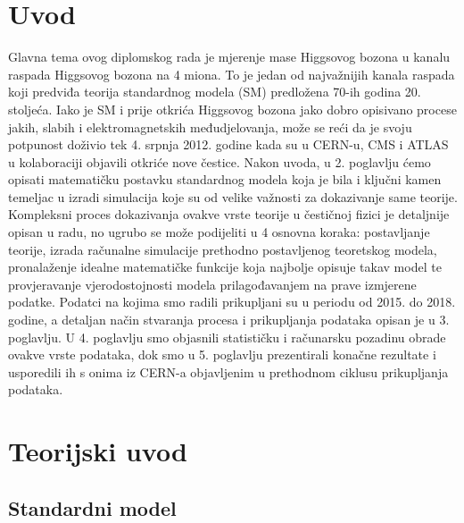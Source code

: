 \documentclass[12pt,a4paper,oneside]{article}
\begin{document}
	\naslovnica %
	\zahvale %
	\tdkHR \tdkEN %
	\tableofcontents %
	\pocetak %
	

	\begin{linenumbers}
		\section{Uvod}
		Glavna tema ovog diplomskog rada je mjerenje mase Higgsovog bozona u kanalu raspada Higgsovog bozona na 4 miona. To je jedan od najvažnijih kanala raspada koji predviđa teorija standardnog modela (SM) predložena 70-ih godina 20. stoljeća. Iako je SM i prije otkrića Higgsovog bozona jako dobro opisivano procese jakih, slabih i elektromagnetskih međudjelovanja, može se reći da je svoju potpunost doživio tek 4. srpnja 2012. godine kada su u CERN-u, CMS i ATLAS u kolaboraciji objavili otkriće nove čestice. 
		Nakon uvoda, u 2. poglavlju ćemo opisati matematičku postavku standardnog modela koja je bila i ključni kamen temeljac u izradi simulacija koje su od velike važnosti za dokazivanje same teorije.
		Kompleksni proces dokazivanja ovakve vrste teorije u čestičnoj fizici je detaljnije opisan u radu, no ugrubo se može podijeliti u 4 osnovna koraka: postavljanje teorije, izrada računalne simulacije prethodno postavljenog teoretskog modela, pronalaženje idealne matematičke funkcije koja najbolje opisuje takav model te provjeravanje vjerodostojnosti modela prilagođavanjem na prave izmjerene podatke.
		Podatci na kojima smo radili prikupljani su u periodu od 2015. do 2018. godine, a detaljan način stvaranja procesa i prikupljanja podataka opisan je u 3. poglavlju. 
		U 4. poglavlju smo objasnili statističku i računarsku pozadinu obrade ovakve vrste podataka, dok smo u 5. poglavlju prezentirali konačne rezultate i usporedili ih s onima iz CERN-a objavljenim u prethodnom ciklusu prikupljanja podataka.
		
		\newpage
		\section{Teorijski uvod}
		
		\subsection{Standardni model}
		

\end{linenumbers}
\end{document}
